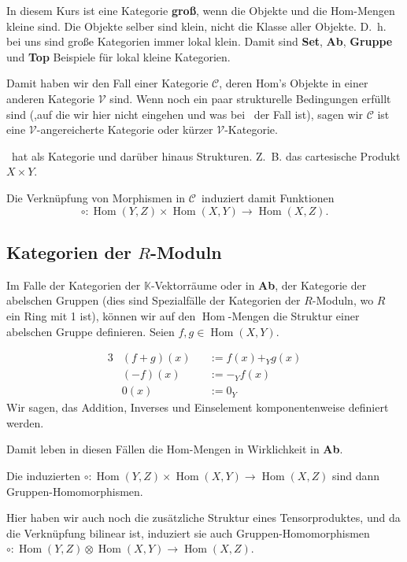 \documentclass[a4paper]{amsart}
\theoremstyle{definition}
\DeclareMathOperator{\Hom}{Hom}
\newcommand{\K}{\ensuremath{\mathbb{ K }}}
\newcommand{\CC}{\ensuremath{\mathcal{ C }}}
\newcommand{\Set}{\text{\textbf{Set}}}
\begin{document}
In diesem Kurs ist eine Kategorie \textbf{groß}, wenn die Objekte und die Hom-Mengen kleine sind. Die Objekte selber sind klein, nicht die Klasse aller Objekte. D.~h. bei uns sind große Kategorien immer lokal klein. Damit sind \textbf{Set}, \textbf{Ab}, \textbf{Gruppe} und \textbf{Top} Beispiele für lokal kleine Kategorien.

Damit haben wir den Fall einer Kategorie $\CC$, deren Hom's Objekte in einer anderen Kategorie $\mathcal{V}$ sind. Wenn noch ein paar strukturelle Bedingungen erfüllt sind (,auf die wir hier nicht eingehen und was bei \Set\ der Fall ist), sagen wir $\CC$ ist eine $\mathcal{V}$-angereicherte Kategorie oder kürzer $\mathcal{V}$-Kategorie.

\Set\ hat als Kategorie und darüber hinaus Strukturen. Z.~B. das cartesische Produkt $X \times Y$.

Die Verknüpfung von Morphismen in \CC\ induziert damit Funktionen
\begin{equation}
   \circ \colon \Hom(Y,Z) \times \Hom(X,Y) \to \Hom(X,Z).
\end{equation}

\subsection{Kategorien der $R$-Moduln}
Im Falle der Kategorien der $\K$-Vektorräume oder in \textbf{Ab}, der Kategorie der abelschen Gruppen (dies sind Spezialfälle der Kategorien der $R$-Moduln, wo $R$ ein Ring mit 1 ist), können wir auf den $\Hom$-Mengen die Struktur einer abelschen Gruppe definieren. Seien $f, g \in  \Hom(X,Y)$. 

\begin{alignat}{3}
   &(f+g)(x) &&:= f(x) +_Y g(x)\\
   &(-f)(x) &&:= -_Yf(x)\\
   &0(x) &&:= 0_Y
\end{alignat}
Wir sagen, das Addition, Inverses und Einselement komponentenweise definiert werden.

Damit leben in diesen Fällen die Hom-Mengen in Wirklichkeit in \textbf{Ab}.

Die induzierten $\circ \colon \Hom(Y,Z) \times \Hom(X,Y) \to \Hom(X,Z)$ sind dann Gruppen-Homomorphismen.

Hier haben wir auch noch die zusätzliche Struktur eines Tensorproduktes, und da die Verknüpfung bilinear ist, induziert sie auch Gruppen-Homomorphismen $\circ \colon \Hom(Y,Z) \otimes \Hom(X,Y) \to \Hom(X,Z)$.
\end{document}
